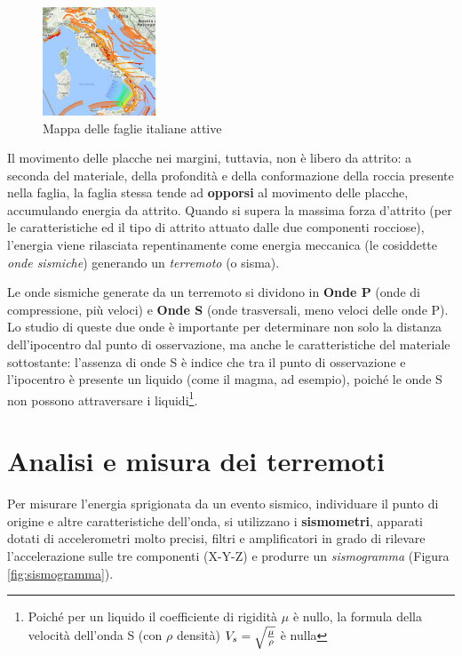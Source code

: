 \documentclass[a4paper,10pt]{memoir}
\begin{document}
\begin{figure}
\label{fig:mappafaglie}
\caption{Mappa delle faglie italiane attive}
\includegraphics[width=0.30\textwidth]{introduzione/mappa_faglie_italiane2}
\end{figure}

Il movimento delle placche nei margini, tuttavia, non è libero da attrito: a seconda del materiale, della profondità e della conformazione della roccia presente nella faglia, la faglia stessa tende ad \textbf{opporsi} al movimento delle placche, accumulando energia da attrito. Quando si supera la massima forza d'attrito (per le caratteristiche ed il tipo di attrito attuato dalle due componenti rocciose), l'energia viene rilasciata repentinamente come energia meccanica (le cosiddette \textit{onde sismiche}) generando un \textit{terremoto} (o sisma).

Le onde sismiche generate da un terremoto si dividono in \textbf{Onde P} (onde di compressione, più veloci) e \textbf{Onde S} (onde trasversali, meno veloci delle onde P). Lo studio di queste due onde è importante per determinare non solo la distanza dell'ipocentro dal punto di osservazione, ma anche le caratteristiche del materiale sottostante: l'assenza di onde S è indice che tra il punto di osservazione e l'ipocentro è presente un liquido (come il magma, ad esempio), poiché le onde S non possono attraversare i liquidi\footnote{Poiché per un liquido il coefficiente di rigidità $\mu$ è nullo, la formula della velocità dell'onda S (con $\rho$ densità) $V_s = \sqrt{\mu \over \rho}$ è nulla}.

\section{Analisi e misura dei terremoti}

Per misurare l'energia sprigionata da un evento sismico, individuare il punto di origine e altre caratteristiche dell'onda, si utilizzano i \textbf{sismometri}, apparati dotati di accelerometri molto precisi, filtri e amplificatori in grado di rilevare l'accelerazione sulle tre componenti (X-Y-Z) e produrre un \textit{sismogramma} (Figura \ref{fig:sismogramma}).
\end{document}
